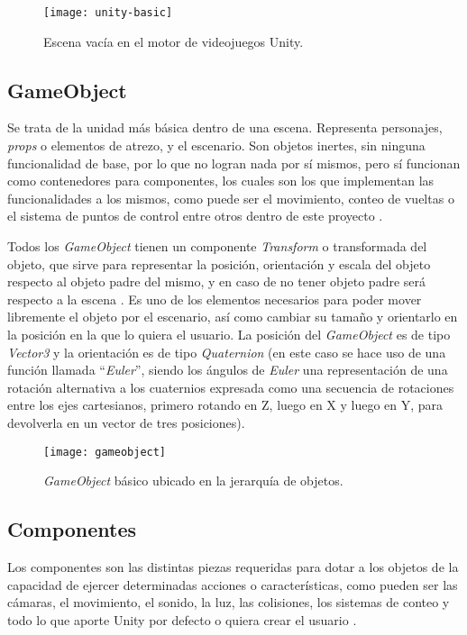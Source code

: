\begin{figure}[h]
	\centering
	\texttt{[image: unity-basic]}
	\caption{Escena vacía en el motor de videojuegos Unity.}
	\label{fig:unity-basic}
\end{figure}

\subsection{GameObject}

Se trata de la unidad más básica dentro de una escena. Representa personajes, \textit{props} o elementos de atrezo, y el escenario. Son objetos inertes, sin ninguna funcionalidad de base, por lo que no logran nada por sí mismos, pero sí funcionan como contenedores para componentes, los cuales son los que implementan las funcionalidades a los mismos, como puede ser el movimiento, conteo de vueltas o el sistema de puntos de control entre otros dentro de este proyecto \cite{doc:gameobject}.

Todos los \textit{GameObject} tienen un componente \textit{Transform} o transformada del objeto, que sirve para representar la posición, orientación y escala del objeto respecto al objeto padre del mismo, y en caso de no tener objeto padre será respecto a la escena \cite{doc:transform}. Es uno de los elementos necesarios para poder mover libremente el objeto por el escenario, así como cambiar su tamaño y orientarlo en la posición en la que lo quiera el usuario. La posición del \textit{GameObject} es de tipo \textit{Vector3} y la orientación es de tipo \textit{Quaternion} (en este caso se hace uso de una función llamada ``\textit{Euler}'', siendo los ángulos de \textit{Euler} una representación de una rotación alternativa a los cuaternios expresada como una secuencia de rotaciones entre los ejes cartesianos, primero rotando en Z, luego en X y luego en Y, para devolverla en un vector de tres posiciones).

\begin{figure}[h]
	\centering
	\texttt{[image: gameobject]}
	\caption{\textit{GameObject} básico ubicado en la jerarquía de objetos.}
	\label{fig:gameobject}
\end{figure}

\subsection{Componentes}

Los componentes son las distintas piezas requeridas para dotar a los objetos de la capacidad de ejercer determinadas acciones o características, como pueden ser las cámaras, el movimiento, el sonido, la luz, las colisiones, los sistemas de conteo y todo lo que aporte Unity por defecto o quiera crear el usuario \cite{doc:component}.

